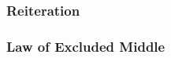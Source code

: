 \vspace{-10pt}
\hrulefill
\vspace{-10pt}
\begin{multicols}{2}
\subsubsection*{Reiteration}

\begin{pf}
	 
\end{pf}

\subsubsection*{Law of Excluded Middle}
\begin{pf}
	\LEM
\end{pf}
\end{multicols}  %


%
%
%
%
%
%







